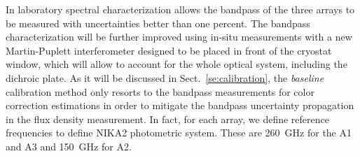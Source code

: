 {\lp In laboratory spectral characterization allows the bandpass of the
three arrays to be measured with uncertainties better than one
percent. The bandpass characterization will be further improved using
in-situ measurements with a new Martin-Puplett interferometer designed
to be placed in front of the cryostat window, which will allow to
account for the whole optical system, including the dichroic plate. As
it will be discussed in Sect.~\ref{se:calibration}, the \emph{baseline} calibration method
only resorts to the bandpass measurements for color correction
estimations in order to mitigate the bandpass uncertainty propagation
in the flux density measurement.}
In fact, for each array, we define reference frequencies %
to define NIKA2 photometric system. These are 260~GHz for the A1 and A3 and
150~GHz for A2.
